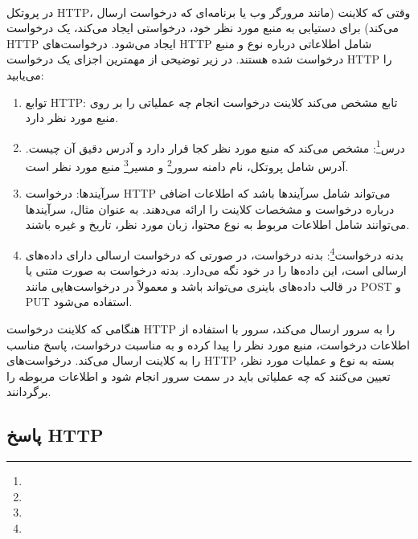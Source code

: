 \paragraph{}
{
    در پروتکل HTTP، وقتی که کلاینت (مانند مرورگر وب یا برنامه‌ای که درخواست ارسال می‌کند) برای دستیابی به منبع مورد نظر خود، درخواستی ایجاد می‌کند، یک درخواست HTTP ایجاد می‌شود. درخواست‌های HTTP شامل اطلاعاتی درباره نوع و منبع درخواست شده هستند. در زیر توضیحی از مهمترین اجزای یک درخواست HTTP را می‌یابید:
    \begin{enumerate}
        \item توابع HTTP: تابع مشخص می‌کند کلاینت درخواست انجام چه عملیاتی را بر روی منبع مورد نظر دارد.
        \item درس\footnote{}: مشخص می‌کند که منبع مورد نظر کجا قرار دارد و آدرس دقیق آن چیست. آدرس شامل پروتکل، نام دامنه سرور\footnote{} و مسیر\footnote{} منبع مورد نظر است.
        \item سرآیندها: درخواست HTTP می‌تواند شامل سرآیندها باشد که اطلاعات اضافی درباره درخواست و مشخصات کلاینت را ارائه می‌دهند. به عنوان مثال، سرآیندها می‌توانند شامل اطلاعات مربوط به نوع محتوا، زبان مورد نظر، تاریخ و غیره باشند.
        \item بدنه درخواست\footnote{}: بدنه درخواست، در صورتی که درخواست ارسالی دارای داده‌های ارسالی است، این داده‌ها را در خود نگه می‌دارد. بدنه درخواست به صورت متنی یا در قالب داده‌های باینری می‌تواند باشد و معمولاً در درخواست‌هایی مانند POST و PUT استفاده می‌شود.
    \end{enumerate}
    هنگامی که کلاینت درخواست HTTP را به سرور ارسال می‌کند، سرور با استفاده از اطلاعات درخواست، منبع مورد نظر را پیدا کرده و به مناسبت درخواست، پاسخ مناسب را به کلاینت ارسال می‌کند. درخواست‌های HTTP بسته به نوع و عملیات مورد نظر، تعیین می‌کنند که چه عملیاتی باید در سمت سرور انجام شود و اطلاعات مربوطه را برگردانند.
}

\subsection{پاسخ‌ HTTP}
\label{subsec:http_responses}
